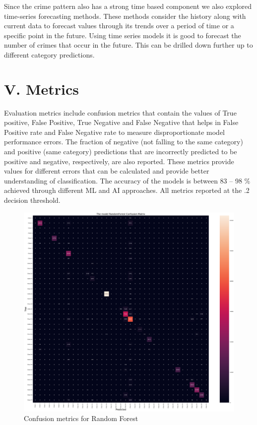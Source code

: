 \documentclass[conference,final,]{IEEEtran}
\begin{document}
Since the crime pattern also has a strong time based component we also
explored time-series forecasting methods. These methods consider the
history along with current data to forecast values through its trends
over a period of time or a specific point in the future. Using time
series models it is good to forecast the number of crimes that occur in
the future. This can be drilled down further up to different category
predictions.

\section{V. Metrics}\label{v.-metrics}

Evaluation metrics include confusion metrics that contain the values of
True positive, False Positive, True Negative and False Negative that
helps in False Positive rate and False Negative rate to measure
disproportionate model performance errors. The fraction of negative (not
falling to the same category) and positive (same category) predictions
that are incorrectly predicted to be positive and negative,
respectively, are also reported. These metrics provide values for
different errors that can be calculated and provide better understanding
of classification. The accuracy of the models is between 83 -- 98 \%
achieved through different ML and AI approaches. All metrics reported at
the .2 decision threshold.

\begin{figure}

{\centering \includegraphics[width=0.7\linewidth]{img/fig12} 

}

\caption{Confusion metrics for Random Forest}\label{fig:unnamed-chunk-12}
\end{figure}
\end{document}
